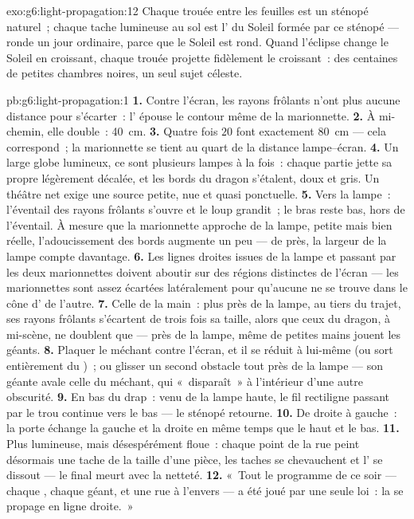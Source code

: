 \begin{solution}{exo:g6:light-propagation:12}
Chaque trouée entre les feuilles est un sténopé naturel~; chaque
tache lumineuse au sol est l' du Soleil formée par ce
sténopé --- ronde un jour ordinaire, parce que le Soleil est rond.
Quand l'éclipse change le Soleil en croissant, chaque trouée projette
fidèlement le croissant~: des centaines de petites chambres noires,
un seul sujet céleste.
\end{solution}

\begin{solution}{pb:g6:light-propagation:1}
\textbf{1.} Contre l'écran, les rayons frôlants n'ont plus aucune
distance pour s'écarter~: l' épouse le contour même de la
marionnette.
\textbf{2.} À mi-chemin, elle double~: \qty{40}{cm}.
\textbf{3.} Quatre fois $20$ font exactement \qty{80}{cm} --- cela
correspond~; la marionnette se tient au quart de la distance
lampe--écran.
\textbf{4.} Un large globe lumineux, ce sont plusieurs lampes à la
fois~: chaque partie jette sa propre  légèrement décalée, et les
bords du dragon s'étalent, doux et gris. Un théâtre net exige une
source petite, nue et quasi ponctuelle.
\textbf{5.} Vers la lampe~: l'éventail des rayons frôlants s'ouvre et
le loup grandit~; le bras reste bas, hors de l'éventail. À mesure que
la marionnette approche de la lampe, petite mais bien réelle,
l'adoucissement des bords augmente un peu --- de près, la largeur de
la lampe compte davantage.
\textbf{6.} Les lignes droites issues de la lampe et passant par les
deux marionnettes doivent aboutir sur des régions distinctes de
l'écran --- les marionnettes sont assez écartées latéralement pour
qu'aucune ne se trouve dans le cône d' de l'autre.
\textbf{7.} Celle de la main~: plus près de la lampe, au tiers du
trajet, ses rayons frôlants s'écartent de trois fois sa taille, alors
que ceux du dragon, à mi-scène, ne doublent que --- près de la lampe,
même de petites mains jouent les géants.
\textbf{8.} Plaquer le méchant contre l'écran, et il se réduit à
lui-même (ou sort entièrement du )~; ou glisser un second
obstacle tout près de la lampe --- son  géante avale celle du
méchant, qui «~disparaît~» à l'intérieur d'une autre obscurité.
\textbf{9.} En bas du drap~: venu de la lampe haute, le fil
rectiligne passant par le trou continue vers le bas --- le sténopé
retourne.
\textbf{10.} De droite à gauche~: la porte échange la gauche et la
droite en même temps que le haut et le bas.
\textbf{11.} Plus lumineuse, mais désespérément floue~: chaque point
de la rue peint désormais une tache de la taille d'une pièce, les
taches se chevauchent et l' se dissout --- le final meurt avec
la netteté.
\textbf{12.} «~Tout le programme de ce soir --- chaque , chaque
géant, et une rue à l'envers --- a été joué par une seule loi~: la
 se propage en ligne droite.~»
\end{solution}
